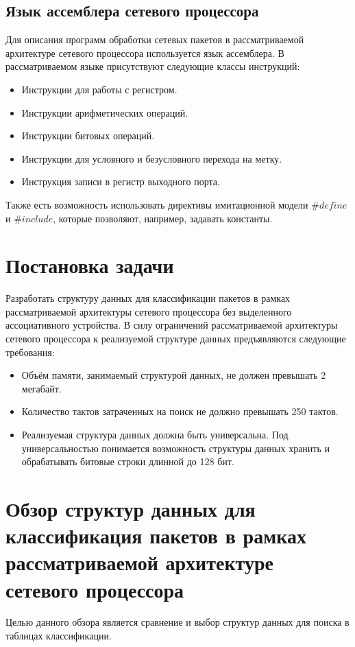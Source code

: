 \documentclass[a4paper, 12pt, titlepage, finall]{extreport}
\begin{document}
        \section{Язык ассемблера сетевого процессора}
            Для описания программ обработки сетевых пакетов в рассматриваемой архитектуре сетевого процессора используется язык ассемблера. 
            В рассматриваемом языке присутствуют следующие классы инструкций:
            \begin{itemize}
                \item Инструкции для работы с регистром.
                \item Инструкции арифметических операций.
                \item Инструкции битовых операций.
                \item Инструкции для условного и безусловного перехода на метку.
                \item Инструкция записи в регистр выходного порта.
            \end{itemize}
            Также есть возможность использовать директивы имитационной модели $\#define$ и $\#include$, которые позволяют, например, задавать константы.
            
    \chapter{Постановка задачи}
\label{section:problem}
        Разработать структуру данных для классификации пакетов в рамках рассматриваемой архитектуры сетевого процессора без выделенного ассоциативного устройства. 
        В силу ограничений рассматриваемой архитектуры сетевого процессора к реализуемой структуре данных предъявляются следующие требования:

        \begin{itemize}
            \item Объём памяти, занимаемый структурой данных, не должен превышать 2 мегабайт.
            \item Количество тактов затраченных на поиск не должно превышать 250 тактов.
            \item Реализуемая структура данных должна быть универсальна. Под универсальностью понимается возможность структуры данных хранить и обрабатывать битовые строки длинной до 128 бит.
        \end{itemize}
    \chapter{Обзор структур данных для классификация пакетов в рамках рассматриваемой архитектуре сетевого процессора}
        Целью данного обзора является сравнение и выбор структур данных для поиска в таблицах классификации. 
\end{document}
